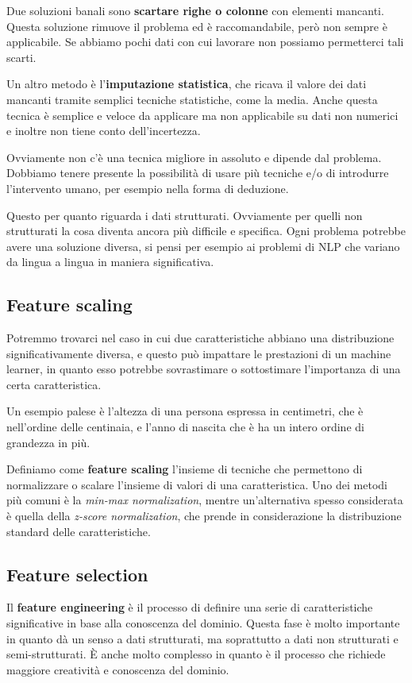         Due soluzioni banali sono \textbf{scartare righe o colonne} con elementi mancanti. Questa soluzione rimuove il problema ed è raccomandabile, però non sempre è applicabile. Se abbiamo pochi dati con cui lavorare non possiamo permetterci tali scarti.
        
        Un altro metodo è l'\textbf{imputazione statistica}, che ricava il valore dei dati mancanti tramite semplici tecniche statistiche, come la media. Anche questa tecnica è semplice e veloce da applicare ma non applicabile su dati non numerici e inoltre non tiene conto dell'incertezza.
        
        Ovviamente non c'è una tecnica migliore in assoluto e dipende dal problema. Dobbiamo tenere presente la possibilità di usare più tecniche e/o di introdurre l'intervento umano, per esempio nella forma di deduzione.
        
        Questo per quanto riguarda i dati strutturati. Ovviamente per quelli non strutturati la cosa diventa ancora più difficile e specifica. Ogni problema potrebbe avere una soluzione diversa, si pensi per esempio ai problemi di NLP che variano da lingua a lingua in maniera significativa.
        
    \subsection{Feature scaling}
        Potremmo trovarci nel caso in cui due caratteristiche abbiano una distribuzione significativamente diversa, e questo può impattare le prestazioni di un machine learner, in quanto esso potrebbe sovrastimare o sottostimare l'importanza di una certa caratteristica.
        
        Un esempio palese è l'altezza di una persona espressa in centimetri, che è nell'ordine delle centinaia, e l'anno di nascita che è ha un intero ordine di grandezza in più.
        
        Definiamo come \textbf{feature scaling} l'insieme di tecniche che permettono di normalizzare o scalare l'insieme di valori di una caratteristica. Uno dei metodi più comuni è la \textit{min-max normalization}, mentre un'alternativa spesso considerata è quella della \textit{z-score normalization}, che prende in considerazione la distribuzione standard delle caratteristiche.
        
    \subsection{Feature selection}
        Il \textbf{feature engineering} è il processo di definire una serie di caratteristiche significative in base alla conoscenza del dominio. Questa fase è molto importante in quanto dà un senso a dati strutturati, ma soprattutto a dati non strutturati e semi-strutturati. È anche molto complesso in quanto è il processo che richiede maggiore creatività e conoscenza del dominio.
        
